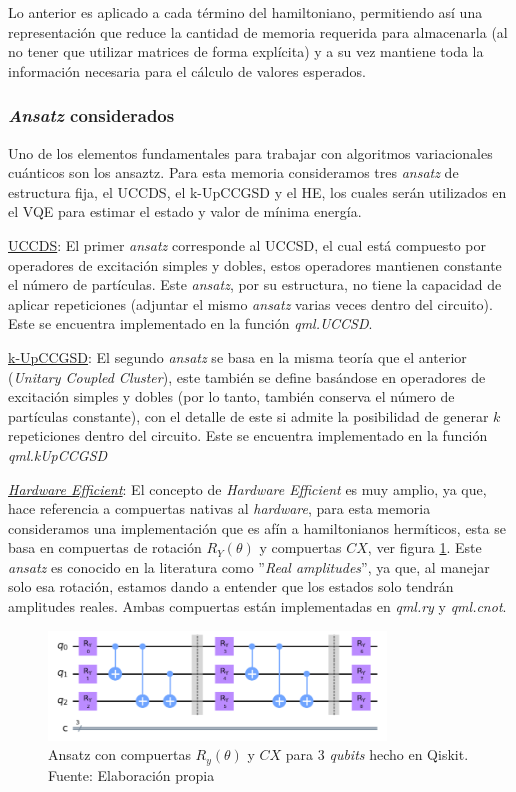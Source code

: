 Lo anterior es aplicado a cada término del hamiltoniano, permitiendo así una representación que reduce la cantidad de memoria requerida para almacenarla (al no tener que utilizar matrices de forma explícita) y a su vez mantiene toda la información necesaria para el cálculo de valores esperados.

%
%
%
%
%
\subsubsection{\textit{Ansatz} considerados}
Uno de los elementos fundamentales para trabajar con algoritmos variacionales cuánticos son los ansaztz. Para esta memoria consideramos tres \textit{ansatz} de estructura fija, el UCCDS, el k-UpCCGSD y el HE, los cuales serán utilizados en el VQE para estimar el estado y valor de mínima energía.

\underline{UCCDS}:
El primer \textit{ansatz} corresponde al UCCSD, el cual está compuesto por operadores de excitación simples y dobles, estos operadores mantienen constante el número de partículas. Este \textit{ansatz}, por su estructura, no tiene la capacidad de aplicar repeticiones (adjuntar el mismo \textit{ansatz} varias veces dentro del circuito). Este se encuentra implementado en la función \textit{qml.UCCSD}.


\underline{k-UpCCGSD}: 
El segundo \textit{ansatz} se basa en la misma teoría que el anterior (\textit{Unitary Coupled Cluster}), este también se define basándose en operadores de excitación simples y dobles (por lo tanto, también conserva el número de partículas constante), con el detalle de este si admite la posibilidad de generar $k$ repeticiones dentro del circuito. Este se encuentra implementado en la función \textit{qml.kUpCCGSD}


\underline{\textit{Hardware Efficient}}: 
El concepto de \textit{Hardware Efficient} es muy amplio, ya que, hace referencia a compuertas nativas al \textit{hardware}, para esta memoria consideramos una implementación que es afín a hamiltonianos hermíticos, esta se basa en compuertas de rotación $R_Y(\theta)$ y compuertas $CX$, ver figura \ref{fig:RY}. Este \textit{ansatz} es conocido en la literatura como ''\textit{Real amplitudes}'', ya que, al manejar solo esa rotación, estamos dando a entender que los estados solo tendrán amplitudes reales. Ambas compuertas están implementadas en \textit{qml.ry} y \textit{qml.cnot}.

\begin{figure}[H]
\centering
\includegraphics[width=0.8\textwidth]{figures/S2/RYansatz.png}
\caption{\label{fig:RY} Ansatz con compuertas $R_y(\theta)$ y $CX$ para 3 \textit{qubits} hecho en Qiskit. Fuente: Elaboración propia}
\end{figure}

